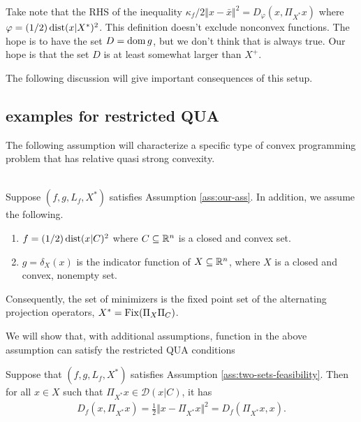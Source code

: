 \documentclass[12pt]{article}
\begin{document}
    \begin{remark}
        Take note that the RHS of the inequality $\kappa_f/2 \Vert x - \bar x\Vert^2 = D_\varphi(x, \Pi_{X^*}x)$ where $\varphi = (1/2)\operatorname{dist}(x | X^*)^2$. 
        This definition doesn't exclude nonconvex functions. 
        The hope is to have the set $D = \operatorname{dom} g$, but we don't think that is always true. 
        Our hope is that the set $D$ is at least somewhat larger than $X^+$. 
    \end{remark}
    The following discussion will give important consequences of this setup. 
    \subsection{examples for restricted QUA}
        The following assumption will characterize a specific type of convex programming problem that has relative quasi strong convexity. 
        \begin{assumption}\;\label{ass:two-sets-feasibility}\\
            Suppose $(f, g, L_f, X^*)$ satisfies Assumption \ref{ass:our-ass}. 
            In addition, we assume the following. 
            \begin{enumerate}[nosep]
                \item $f = (1/2)\operatorname{dist}(x | C)^2$ where $C \subseteq \mathbb R^n$ is a closed and convex set. 
                \item $g = \delta_X(x)$ is the indicator function of $X \subseteq \mathbb R^n$, where $X$ is a closed and convex, nonempty set. 
            \end{enumerate}
            Consequently, the set of minimizers is the fixed point set of the alternating projection operators, $X^* = \operatorname{Fix} (\Pi_X \Pi_C)$. 
        \end{assumption}
        We will show that, with additional assumptions, function in the above assumption can satisfy the restricted QUA conditions 
        \begin{theorem}\label{thm:example-rqua}
            Suppose that $(f, g, L_f, X^*)$ satisfies Assumption \ref{ass:two-sets-feasibility}. 
            Then for all $x\in X$ such that $\Pi_{X^*} x\in \mathcal D(x | C)$, it has 
            \begin{align*}
                D_f(x, \Pi_{X^*}x) = \frac{1}{2}\Vert x - \Pi_{X^*} x\Vert^2 = D_f(\Pi_{X^*}x, x). 
            \end{align*}
        \end{theorem}
\end{document}
